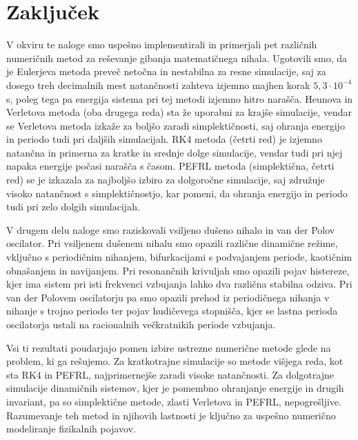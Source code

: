 \documentclass[12pt,a4paper]{article}
\begin{document}
\section{Zaključek}

V okviru te naloge smo uspešno implementirali in primerjali pet različnih numeričnih metod za reševanje gibanja matematičnega nihala. Ugotovili smo, da je Eulerjeva metoda preveč netočna in nestabilna za resne simulacije, saj za dosego treh decimalnih mest natančnosti zahteva izjemno majhen korak $5,3 \cdot 10^{-4}$ s, poleg tega pa energija sistema pri tej metodi izjemno hitro narašča. Heunova in Verletova metoda (oba drugega reda) sta že uporabni za krajše simulacije, vendar se Verletova metoda izkaže za boljšo zaradi simplektičnosti, saj ohranja energijo in periodo tudi pri daljših simulacijah. RK4 metoda (četrti red) je izjemno natančna in primerna za kratke in srednje dolge simulacije, vendar tudi pri njej napaka energije počasi narašča s časom. PEFRL metoda (simplektična, četrti red) se je izkazala za najboljšo izbiro za dolgoročne simulacije, saj združuje visoko natančnost s simplektičnostjo, kar pomeni, da ohranja energijo in periodo tudi pri zelo dolgih simulacijah.

V drugem delu naloge smo raziskovali vsiljeno dušeno nihalo in van der Polov oscilator. Pri vsiljenem dušenem nihalu smo opazili različne dinamične režime, vključno s periodičnim nihanjem, bifurkacijami s podvajanjem periode, kaotičnim obnašanjem in navijanjem. Pri resonančnih krivuljah smo opazili pojav histereze, kjer ima sistem pri isti frekvenci vzbujanja lahko dva različna stabilna odziva. Pri van der Polovem oscilatorju pa smo opazili prehod iz periodičnega nihanja v nihanje s trojno periodo ter pojav hudičevega stopnišča, kjer se lastna perioda oscilatorja ustali na racionalnih večkratnikih periode vzbujanja.

Vsi ti rezultati poudarjajo pomen izbire ustrezne numerične metode glede na problem, ki ga rešujemo. Za kratkotrajne simulacije so metode višjega reda, kot sta RK4 in PEFRL, najprimernejše zaradi visoke natančnosti. Za dolgotrajne simulacije dinamičnih sistemov, kjer je pomembno ohranjanje energije in drugih invariant, pa so simplektične metode, zlasti Verletova in PEFRL, nepogrešljive. Razumevanje teh metod in njihovih lastnosti je ključno za uspešno numerično modeliranje fizikalnih pojavov.
\end{document}
